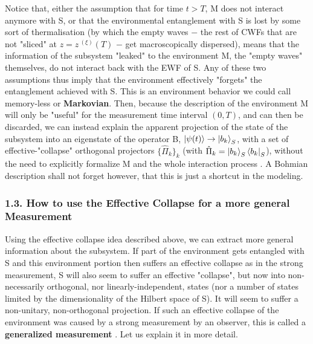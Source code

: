 \documentclass[11pt, a4paper]{article} %
\begin{document}
Notice that, either the assumption that for time $t>T$, M does not interact anymore with S, or that the environmental entanglement with S is lost by some sort of thermalisation (by which the empty waves $-$ the rest of CWFs that are not "sliced" at $z=z^{\:(\xi)}(T)$ $-$ get macroscopically dispersed), means that the information of the subsystem "leaked" to the environment M, the "empty waves" themselves, do not interact back with the EWF of S. Any of these two assumptions thus imply that the environment effectively "forgets" the entanglement achieved with S. This is an environment behavior we could call memory-less or {\bf Markovian}. Then, because the description of the environment M will only be "useful" for the measurement time interval $(0,T)$, and can then be discarded, we can instead explain the apparent projection of the state of the subsystem into an eigenstate of the operator B, $\ket{\psi(t)}\to \ket{b_k}_S$, with a set of effective-"collapse" orthogonal projectors $\{\hat{\Pi}_k\}_k$ (with $\hat{\Pi}_k=\ket{b_k}_S\bra{b_k}_S$), without the need to explicitly formalize M and the whole interaction process \cite{Durr}. A Bohmian description shall not forget however, that this is just a shortcut in the modeling.\vspace{-0.3cm}



\subsubsection*{1.3. How to use the Effective Collapse for a more general Measurement}\vspace{-0.1cm}

Using the effective collapse idea described above, we can extract more general information about the subsystem. If part of the environment gets entangled with S and this environment portion then suffers an effective collapse as in the strong measurement, S will also seem to suffer an effective "collapse", but now into non-necessarily orthogonal, nor linearly-independent, states (nor a number of states limited by the dimensionality of the Hilbert space of S). It will seem to suffer a non-unitary, non-orthogonal projection. If such an effective collapse of the environment was caused by a strong measurement by an observer, this is called a {\bf generalized measurement} \cite{Generalized, Durr}. Let us explain it in more detail.
\end{document}
